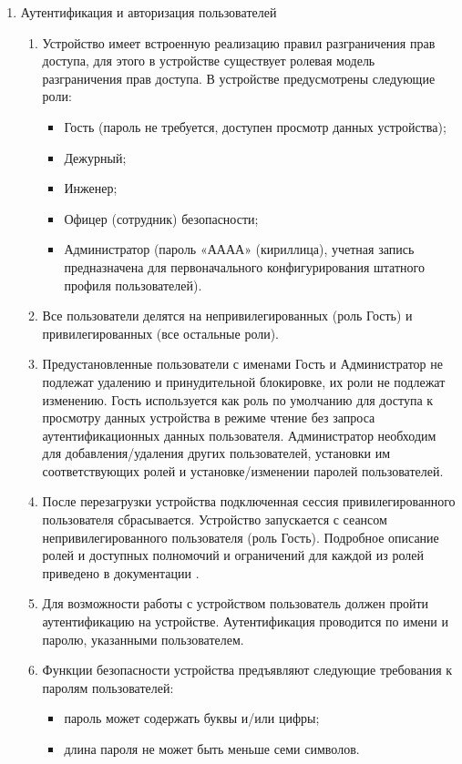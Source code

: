\begin{enumerate}
\item Аутентификация и авторизация пользователей
\begin{enumerate}
\item Устройство имеет встроенную реализацию правил разграничения прав доступа, для этого в устройстве существует ролевая модель разграничения прав доступа.
В устройстве предусмотрены следующие роли:
\begin{itemize}
\item Гость (пароль не требуется, доступен просмотр данных устройства);
\item Дежурный;
\item Инженер;
\item Офицер (сотрудник) безопасности;
\item Администратор (пароль «АААА» (кириллица), учетная запись предназначена для первоначального конфигурирования штатного профиля пользователей).
\end{itemize}
\item Все пользователи делятся на непривилегированных (роль Гость) и привилегированных (все остальные роли).
\item Предустановленные пользователи с именами Гость и Администратор не подлежат удалению и принудительной блокировке, их роли не подлежат изменению.
Гость используется как роль по умолчанию для доступа к просмотру данных устройства в режиме чтение без запроса аутентификационных данных пользователя.
Администратор необходим для добавления/удаления других пользователей, установки им соответствующих ролей и установке/изменении паролей пользователей.
\item После перезагрузки устройства подключенная сессия привилегированного пользователя сбрасывается.
Устройство запускается с сеансом непривилегированного пользователя (роль Гость).
Подробное описание ролей и доступных полномочий и ограничений для каждой из ролей приведено в документации \ManualUnitGeneral.
\item Для возможности работы с устройством пользователь должен пройти аутентификацию на устройстве.
Аутентификация проводится по имени и паролю, указанными пользователем.
\item Функции безопасности устройства предъявляют следующие требования к паролям пользователей:
\begin{itemize}
  \item пароль может содержать буквы и/или цифры;
  \item длина пароля не может быть меньше семи символов.

\end{itemize}
\end{enumerate}
\end{enumerate}
